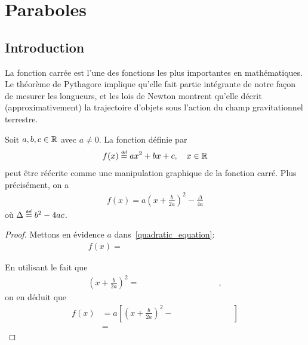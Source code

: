 \documentclass[main.tex]{subfiles}
\begin{document}
\chapter{Paraboles}

\section{Introduction}

La fonction carrée est l'une des fonctions les plus importantes en mathématiques.
Le théorème de Pythagore implique qu'elle fait partie intégrante de notre façon de mesurer les longueurs,
et les lois de Newton montrent qu'elle décrit (approximativement) la trajectoire d'objets sous l'action du champ gravitationnel terrestre.

\begin{proposition}
    Soit $a, b, c \in \mathbb{R}$ avec $a \neq 0$.
    La fonction définie par
    \begin{align}
        f(x) \defeq ax^2 + bx + c,
        \quad x \in \R
        \label{quadratic_equation}
    \end{align}
    peut être réécrite comme une manipulation graphique de la fonction carré.
    Plus précisément, on a
    \begin{align}
        f(x) = a{\left(x + \frac b {2 a}\right)}^2 - {\frac \Delta {4a}}
    \end{align}
    où $\Delta \defeq b^2 - 4ac$.
\end{proposition}
\begin{proof}
    Mettons en évidence $a$ dans~\eqref{quadratic_equation}:
    \begin{align}
        f(x) = \hspace{5cm}
    \end{align}

    En utilisant le fait que
    \begin{align}
        {\left(x + \frac b {2 a}\right)}^2 = \hspace{4cm},
    \end{align}
    on en déduit que
    \begin{align}
        f(x) &= a\left[{\left(x + \frac b {2a}\right)}^2 - \hspace{3cm}\right]\\
             &=
    \end{align}
\end{proof}
\end{document}
